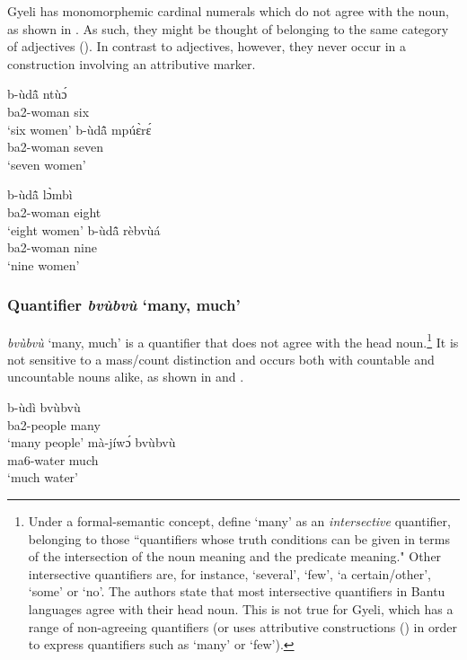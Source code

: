 Gyeli has monomorphemic cardinal numerals which do not agree with the noun, as shown in . As such, they might be thought of belonging to the same category of adjectives (). In contrast to adjectives, however, they never occur in a construction involving an attributive marker.

\ea\label {ModNumx2}
    \ea
    \gll b-ùdã̂ ntùɔ́\\
    ba2-woman six \\
\glt `six women'
    \ex
    \gll
    b-ùdã̂ mpúɛ̀rɛ́ \\
    ba2-woman seven \\
\glt `seven women'


    \ex
    \gll  b-ùdã̂ lɔ̀mbì\\
    ba2-woman eight \\
\glt `eight women'
    \ex
    \gll b-ùdã̂ rèbvùá \\
    ba2-woman nine \\
\glt `nine women'
    \z
\z


\subsubsection{Quantifier {\itshape bvùbvù} `many, much'}
\label{sec:many}

{\itshape bvùbvù} `many, much'  is a  quantifier that does not agree with the head noun.\footnote{Under a formal-semantic concept, \citet[388]{zerbian2008} define `many' as an {\itshape intersective} quantifier, belonging to those ``quantifiers whose truth conditions can be given in terms of the intersection of the noun meaning and the predicate meaning."  Other intersective quantifiers are, for instance, `several', `few', `a certain/other', `some' or `no'. The authors state that most intersective quantifiers in Bantu languages agree with their head noun. This is not true for Gyeli, which has a range of non-agreeing quantifiers (or uses attributive constructions () in order to express quantifiers such as `many' or `few').}
It is not sensitive to a mass/count distinction and occurs both with countable and uncountable nouns alike, as shown in  and .


\ea \label{Invbvu}
  \ea \label{Invbvu1}
 \gll  b-ùdì  bvùbvù \\
          ba2-people many  \\
    \trans `many people'
\ex \label{Invbvu2}
  \gll    mà-jíwɔ́ bvùbvù \\
              ma6-water much \\
    \trans `much water'
\z
\z

